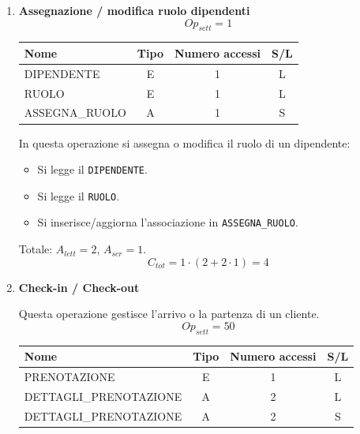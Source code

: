 \documentclass[a4paper,12pt]{report}
\begin{document}
\begin{enumerate}
    
    
	\item {\large \textbf{Assegnazione / modifica ruolo dipendenti}} \label{op12}
    $$
    Op_{sett} = 1
    $$

    \begin{table}[H]
    \centering
    \small
    \renewcommand{\arraystretch}{1.15}
    \begin{tabularx}{0.8\textwidth}{|X|c|c|c|}
        \hline
        \rowcolor{gray!20}
        \textbf{Nome} & \textbf{Tipo} & \textbf{Numero accessi} & \textbf{S/L} \\
        \hline
        DIPENDENTE & E & 1 & L \\
        RUOLO & E & 1 & L \\
        ASSEGNA\_RUOLO & A & 1 & S \\
        \hline
    \end{tabularx}
    \end{table}

    In questa operazione si assegna o modifica il ruolo di un dipendente:
    \begin{itemize}
      \item Si legge il \texttt{DIPENDENTE}.
      \item Si legge il \texttt{RUOLO}.
      \item Si inserisce/aggiorna l’associazione in \texttt{ASSEGNA\_RUOLO}.
    \end{itemize}

    Totale: $A_{lett}=2$, $A_{scr}=1$. \\
    \[
    C_{tot} = 1 \cdot (2 + 2 \cdot 1) = 4
    \]
    
    
	\item {\large \textbf{Check-in / Check-out}} \label{op13}
    
    Questa operazione gestisce l'arrivo o la partenza di un cliente.
    $$
    Op_{sett} = 50
    $$
    

    \begin{table}[H]
    \centering
    \small
    \renewcommand{\arraystretch}{1.15}
    \begin{tabularx}{0.8\textwidth}{|X|c|c|c|}
        \hline
        \rowcolor{gray!20}
        \textbf{Nome} & \textbf{Tipo} & \textbf{Numero accessi} & \textbf{S/L} \\
        \hline
        PRENOTAZIONE & E & 1 & L \\
        DETTAGLI\_PRENOTAZIONE & A & 2 & L \\
        DETTAGLI\_PRENOTAZIONE & A & 2 & S \\
        \hline
    \end{tabularx}
    \end{table}


\end{enumerate}
\end{document}
